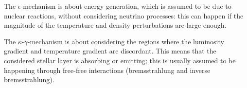 \documentclass[main.tex]{subfiles}
\begin{document}
The \(\epsilon \)-mechanism is about energy generation, which is assumed to be due to nuclear reactions, without considering neutrino processes:
this can happen if the magnitude of the temperature and density perturbations are large enough.

The \(\kappa \)-\(\gamma \)-mechanism is about considering the regions where the luminosity gradient and temperature gradient are discordant.
This means that the considered stellar layer is absorbing or emitting; this is usually assumed to be happening through free-free interactions (bremsstrahlung and inverse bremsstrahlung).
\end{document}
